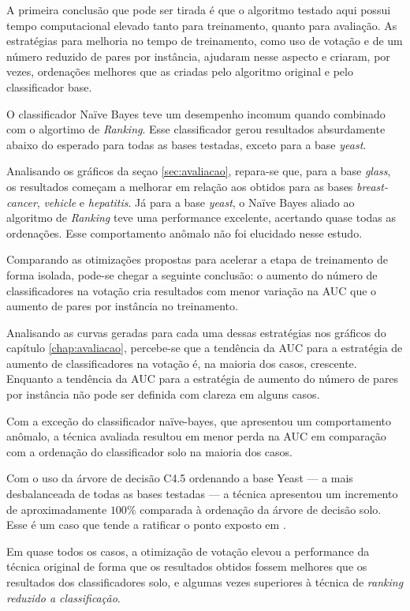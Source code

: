 A primeira conclusão que pode ser tirada é que o algoritmo testado aqui possui tempo computacional elevado tanto para treinamento, quanto para avaliação. As estratégias para melhoria no tempo de treinamento, como uso de votação e de um número reduzido de pares por instância, ajudaram nesse aspecto e criaram, por vezes, ordenações melhores que as criadas pelo algoritmo original e pelo classificador base.

O classificador Naïve Bayes teve um desempenho incomum quando combinado com o algortimo de \emph{Ranking}. Esse classificador gerou resultados absurdamente abaixo do esperado para todas as bases testadas, exceto para a base \emph{yeast}.

Analisando os gráficos da seçao \ref{sec:avaliacao}, repara-se que, para a base \emph{glass}, os resultados começam a melhorar em relação aos obtidos para as bases \emph{breast-cancer}, \emph{vehicle} e \emph{hepatitis}. Já para a base \emph{yeast}, o Naïve Bayes aliado ao algoritmo de \emph{Ranking} teve uma performance excelente, acertando quase todas as ordenações. Esse comportamento anômalo não foi elucidado nesse estudo.

Comparando as otimizações propostas para acelerar a etapa de treinamento de forma isolada, pode-se chegar a seguinte conclusão: o aumento do número de classificadores na votação cria resultados com menor variação na AUC que o aumento de pares por instância no treinamento.

Analisando as curvas geradas para cada uma dessas estratégias nos gráficos do capítulo \ref{chap:avaliacao}, percebe-se que a tendência da AUC para a estratégia de aumento de classificadores na votação é, na maioria dos casos, crescente. Enquanto a tendência da AUC para a estratégia de aumento do número de pares por instância não pode ser definida com clareza em alguns casos.

Com a exceção do classificador naïve-bayes, que apresentou um comportamento anômalo, a técnica avaliada resultou em menor perda na AUC em comparação com a ordenação do classificador solo na maioria dos casos.

Com o uso da árvore de decisão C4.5 ordenando a base Yeast --- a mais desbalanceada de todas as bases testadas --- a técnica apresentou um incremento de aproximadamente $100\%$ comparada à ordenação da árvore de decisão solo. Esse é um caso que tende a ratificar o ponto exposto em \cite{langford08}.

Em quase todos os casos, a otimização de votação elevou a performance da técnica original de forma que os resultados obtidos fossem melhores que os resultados dos classificadores solo, e algumas vezes superiores à técnica de \emph{ranking reduzido a classificação}.